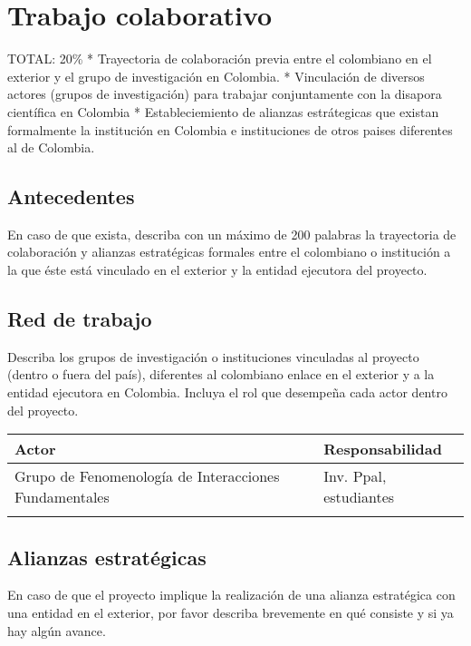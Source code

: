 
\section{Trabajo colaborativo}
\begin{evaluacion}
  TOTAL: 20\% 
  * Trayectoria de colaboración previa entre el colombiano
  en el exterior y el grupo de investigación en Colombia.
  * Vinculación de diversos actores (grupos de investigación) para
  trabajar conjuntamente con la disapora científica en Colombia
  * Estableciemiento de alianzas estrátegicas que existan formalmente
  la institución en Colombia e instituciones de otros paises
  diferentes al de Colombia.
\end{evaluacion}

\subsection{Antecedentes}
\begin{instrucciones}
  En caso de que exista, describa con un máximo de 200 palabras la
  trayectoria de colaboración y alianzas estratégicas formales entre
  el colombiano o institución a la que éste está vinculado en el
  exterior y la entidad ejecutora del proyecto.  
\end{instrucciones}

\subsection{Red de trabajo}
\begin{instrucciones}
  Describa los grupos de investigación o instituciones vinculadas al
  proyecto (dentro o fuera del país), diferentes al colombiano enlace
  en el exterior y a la entidad ejecutora en Colombia. Incluya el rol
  que desempeña cada actor dentro del proyecto.
\end{instrucciones}

\begin{tabular}{|l|l|}\hline
Actor & Responsabilidad\\\hline  
Grupo de Fenomenología de Interacciones Fundamentales & Inv. Ppal,
estudiantes\\\hline
& \\\hline
\end{tabular}

\subsection{Alianzas estratégicas}
\begin{instrucciones}
  En caso de que el proyecto implique la realización de una alianza
  estratégica con una entidad en el exterior, por favor describa
  brevemente en qué consiste y si ya hay algún avance.
\end{instrucciones}

